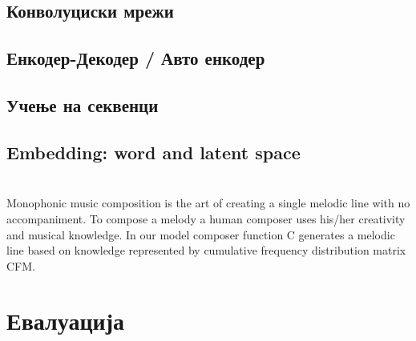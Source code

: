 \section{Конволуциски мрежи}
 
\section{Енкодер-Декодер / Авто енкодер}

\section{Учење на секвенци}

\section{Embedding: word and latent space}

\chapter{}
Monophonic music composition is the art of creating a single melodic line with no accompaniment. To compose a melody a human composer uses his/her creativity and musical knowledge. In our model composer function C generates a melodic line based on knowledge represented by cumulative frequency distribution matrix CFM.

\chapter{Евалуација}

